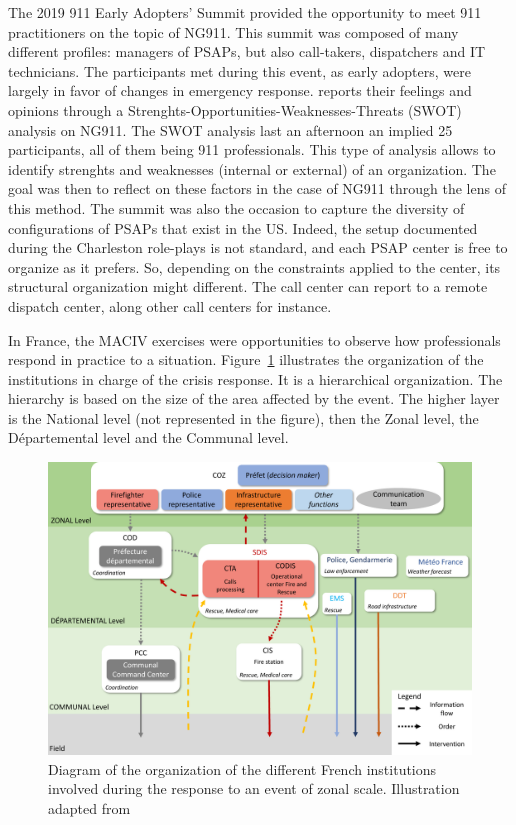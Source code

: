 The 2019 911 Early Adopters’ Summit provided the opportunity to meet 911 practitioners on the topic of NG911.
This summit was composed of many different profiles: managers of PSAPs, but also call-takers, dispatchers and IT technicians.
The participants met during this event, as early adopters, were largely in favor of changes in emergency response.
\textcite{graceCommunicatingNextGeneration9112020} reports their feelings and opinions through a Strenghts-Opportunities-Weaknesses-Threats (SWOT) analysis \parencite{gaoConsolidatingSWOTAnalysis2011} on NG911.
The SWOT analysis last an afternoon an implied 25 participants, all of them being 911 professionals.
This type of analysis allows to identify strenghts and weaknesses (internal or external) of an organization.
The goal was then to reflect on these factors in the case of NG911 through the lens of this method.
The summit was also the occasion to capture the diversity of configurations of PSAPs that exist in the US.
Indeed, the setup documented during the Charleston role-plays is not standard, and each PSAP center is free to organize as it prefers.
So, depending on the constraints applied to the center, its structural organization might different.
The call center can report to a remote dispatch center, along other call centers for instance.

In France, the MACIV exercises were opportunities to observe how professionals respond in practice to a situation.
Figure~\ref{information:french-orga} illustrates the organization of the institutions in charge of the crisis response.
It is a hierarchical organization.
The hierarchy is based on the size of the area affected by the event.
The higher layer is the National level (not represented in the figure), then the Zonal level, the Départemental level and the Communal level.

\begin{figure}[htb]
    \centering
    \includegraphics[width=\textwidth]{figures/chap-3/orga-gestion-crise.pdf}
    \caption{Diagram of the organization of the different French institutions involved during the response to an event of zonal scale. Illustration adapted from \textcite{batardIntegrerContributionsCitoyennes2021}}
    \label{information:french-orga}
\end{figure}


